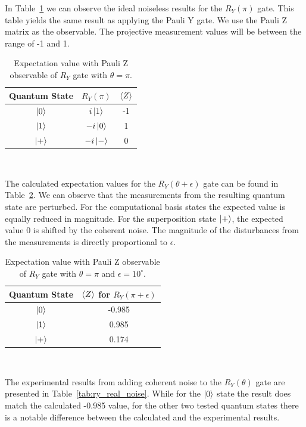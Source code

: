 In Table~\ref{tab:ry_ideal} we can observe the ideal noiseless results
for the \(R_{Y}(\pi)\) gate. This table yields the same result as applying
the Pauli Y gate. We use the Pauli Z matrix as the observable. The 
projective measurement values will be between the range of -1 and 1.

\begin{table}[h]
  \centering
  \begin{tabular}{|c|c|c|}
    \hline
    Quantum State & \(R_{Y}\left(\pi\right)\) & \(\expval{Z}\) \\
    \hline
    \(\ket{0}\) & \(i\ket{1}\) & -1 \\
    \hline
    \(\ket{1}\) & \(-i\ket{0}\) & 1 \\
    \hline
    \(\ket{+}\) & \(-i\ket{-}\) & 0 \\
    \hline
  \end{tabular}
  \caption{Expectation value with Pauli Z observable of \(R_{Y}\) gate with \(\theta = \pi\).}\label{tab:ry_ideal}
\end{table} \

The calculated expectation values for the \(R_{Y}(\theta + \epsilon)\) gate
can be found in Table~\ref{tab:ry_iso_noise}. We can observe that the
measurements from the resulting quantum state are perturbed. For the
computational basis states the expected value is equally reduced in magnitude.
For the superposition state \(\ket{+}\), the expected value 0 is shifted
by the coherent noise. The magnitude of the disturbances from the
measurements is directly proportional to \(\epsilon\). \

\begin{table}[h]
  \centering
  \begin{tabular}{|c|c|}
    \hline
    Quantum State & \(\expval{Z}\) for \(R_{Y}\left(\pi+\epsilon\right)\) \\
    \hline
    \(\ket{0}\) & -0.985 \\
    \hline
    \(\ket{1}\) & 0.985 \\
    \hline
    \(\ket{+}\) &  0.174 \\
    \hline
  \end{tabular}
  \caption{Expectation value with Pauli Z observable of \(R_{Y}\) gate with \(\theta = \pi\) and \(\epsilon = 10^{\circ}\).}\label{tab:ry_iso_noise}
\end{table} \

The experimental results from adding coherent noise to the
\(R_{Y}(\theta)\) gate are presented in Table~\ref{tab:ry_real_noise}. 
While for the \(\ket{0}\) state the result does match the calculated
-0.985 value, for the other two tested quantum states there is a
notable difference between the calculated and the experimental results. \

